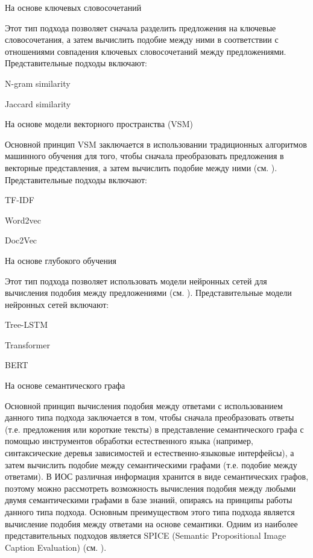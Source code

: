 \begin{textitemize}
	\item На основе ключевых словосочетаний
	
	Этот тип подхода позволяет сначала разделить предложения на ключевые словосочетания, а затем вычислить подобие между ними в соответствии с отношениями совпадения ключевых словосочетаний между предложениями. Представительные подходы включают:
	
	\begin{textitemize}
		\item N-gram similarity
		\item Jaccard similarity
	\end{textitemize}
	
	\item На основе модели векторного пространства (VSM)
	
	Основной принцип VSM заключается в использовании традиционных алгоритмов машинного обучения для того, чтобы сначала преобразовать предложения в векторные представления, а затем вычислить подобие между ними (см. ). Представительные подходы включают:
	
	\begin{textitemize}
		\item TF-IDF
		\item Word2vec
		\item Doc2Vec
	\end{textitemize}
	
	\item На основе глубокого обучения
	
	Этот тип подхода позволяет использовать модели нейронных сетей для вычисления подобия между предложениями (см. ). Представительные модели нейронных сетей включают:
	
	\begin{textitemize}
		\item Tree-LSTM
		\item Transformer
		\item BERT
	\end{textitemize}
	
	\item На основе семантического графа
	
	Основной принцип вычисления подобия между ответами с использованием данного типа подхода заключается в том, чтобы сначала преобразовать ответы (т.е. предложения или короткие тексты) в представление семантического графа с помощью инструментов обработки естественного языка (например, синтаксические деревья зависимостей и естественно-языковые интерфейсы), а затем вычислить подобие между семантическими графами (т.е. подобие между ответами). В ИОС различная информация хранится в виде семантических графов, поэтому можно рассмотреть возможность вычисления подобия между любыми двумя семантическими графами в базе знаний, опираясь на принципы работы данного типа подхода. Основным преимуществом этого типа подхода является вычисление подобия между ответами на основе семантики. Одним из наиболее представительных подходов является SPICE (Semantic Propositional Image Caption Evaluation) (см. ). 
	

\end{textitemize}
